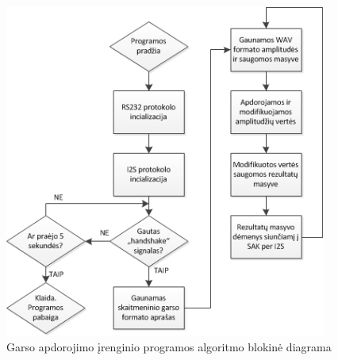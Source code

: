 \documentclass[]{vgtuef}
\begin{document}
\begin{figure}[!ht]
  \centering
  \includegraphics[width=400px]{img/garso_apdorojimas.png}
  \caption{Garso apdorojimo įrenginio programos algoritmo blokinė diagrama}
  \label{fig:garso_apdorojimas}
\end{figure}
\end{document}
